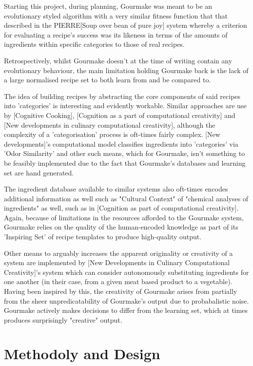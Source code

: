 \documentclass[9pt,titlepage,a4paper]{extarticle}
\begin{document}
    Starting this project, during planning, Gourmake was meant to be an evolutionary styled algorithm with
    a very similar fitness function that that described in the PIERRE[Soup over bean of pure joy] system whereby a criterion for
    evaluating a recipe's success was its likeness in terms of the amounts of ingredients within specific
    categories to those of real recipes.

    Retrospectively, whilst Gourmake doesn't at the time of writing contain any evolutionary behaviour,
    the main limitation holding Gourmake back is the lack of a large normalised recipe set to both learn
    from and be compared to.

    The idea of building recipes by abstracting the core components of said recipes into 'categories' is interesting and evidently
    workable. Similar approaches are use by [Cognitive Cooking], [Cognition as a part of computational creativity] and [New developments
    in culinary computational creativity], although the complexity of a 'categorisation' process is oft-times fairly complex. [New developments]'s
    computational model classifies ingredients into 'categories' via 'Odor Similarity' and other such means, which for Gourmake, isn't
    something to be feasibly implemented due to the fact that Gourmake's databases and learning set are hand generated.

    The ingredient database available to similar systems also oft-times encodes additional information as well such as "Cultural Context" of 
    "chemical analyses of ingredients" as well, such as in [Cognition as part of computational creativity]. Again, because of limitations
    in the resources afforded to the Gourmake system, Gourmake relies on the quality of the human-encoded knowledge as part of its
    'Inspiring Set' of recipe templates to produce high-quality output.

    Other means to arguably increases the apparent originality or creativity of a system are implemented by [New Developments in Culinary Computational Creativity]'s
    system which can consider autonomously substituting ingredients for one another (in their case, from a given meat based product to
    a vegetable). Having been inspired by this, the creativity of Gourmake arises from partially from the sheer unpredicatability of
    Gourmake's output due to probabalistic noise. Gourmake actively makes decisions to differ from the learning set, which at times produces
    surprisingly "creative" output.

\section{Methodoly and Design}
\end{document}
